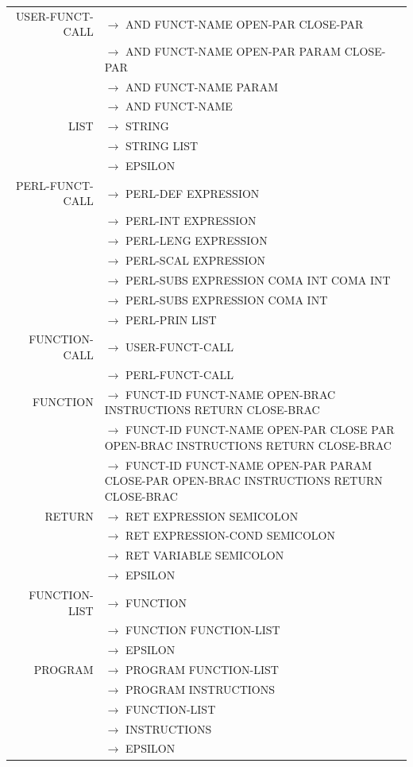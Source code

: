 \documentclass[a4paper,10pt]{article}
\begin{document}
\begin{center}
\begin{longtable}{rl}
USER-FUNCT-CALL		& $\rightarrow$ AND FUNCT-NAME OPEN-PAR CLOSE-PAR\\ 
					& $\rightarrow$ AND FUNCT-NAME OPEN-PAR PARAM CLOSE-PAR\\ 
					& $\rightarrow$ AND FUNCT-NAME PARAM\\ 
					& $\rightarrow$ AND FUNCT-NAME\\ 

LIST				& $\rightarrow$ STRING \\
					& $\rightarrow$ STRING LIST\\
					& $\rightarrow$ EPSILON\\
					
PERL-FUNCT-CALL		& $\rightarrow$ PERL-DEF EXPRESSION \\
					& $\rightarrow$ PERL-INT EXPRESSION \\
					& $\rightarrow$ PERL-LENG EXPRESSION \\ 
					& $\rightarrow$ PERL-SCAL EXPRESSION \\
					& $\rightarrow$ PERL-SUBS EXPRESSION COMA INT COMA INT \\
					& $\rightarrow$ PERL-SUBS EXPRESSION COMA INT  \\
					& $\rightarrow$ PERL-PRIN LIST \\ 
					
					
FUNCTION-CALL		& $\rightarrow$ USER-FUNCT-CALL \\
					& $\rightarrow$ PERL-FUNCT-CALL \\


FUNCTION			& $\rightarrow$ FUNCT-ID FUNCT-NAME OPEN-BRAC INSTRUCTIONS RETURN CLOSE-BRAC \\
					& $\rightarrow$ FUNCT-ID FUNCT-NAME OPEN-PAR CLOSE PAR OPEN-BRAC INSTRUCTIONS RETURN CLOSE-BRAC \\
					& $\rightarrow$ FUNCT-ID FUNCT-NAME OPEN-PAR PARAM CLOSE-PAR OPEN-BRAC INSTRUCTIONS RETURN CLOSE-BRAC \\

RETURN				& $\rightarrow$ RET EXPRESSION SEMICOLON\\
					& $\rightarrow$ RET EXPRESSION-COND SEMICOLON\\
					& $\rightarrow$ RET VARIABLE SEMICOLON\\
					& $\rightarrow$ EPSILON \\
					
FUNCTION-LIST		& $\rightarrow$ FUNCTION \\
					& $\rightarrow$ FUNCTION FUNCTION-LIST\\
					& $\rightarrow$ EPSILON\\

PROGRAM				& $\rightarrow$ PROGRAM FUNCTION-LIST\\
					& $\rightarrow$ PROGRAM INSTRUCTIONS\\
					& $\rightarrow$ FUNCTION-LIST\\
					& $\rightarrow$ INSTRUCTIONS\\
					& $\rightarrow$ EPSILON\\
					
					
\end{longtable}
\end{center}
\end{document}
